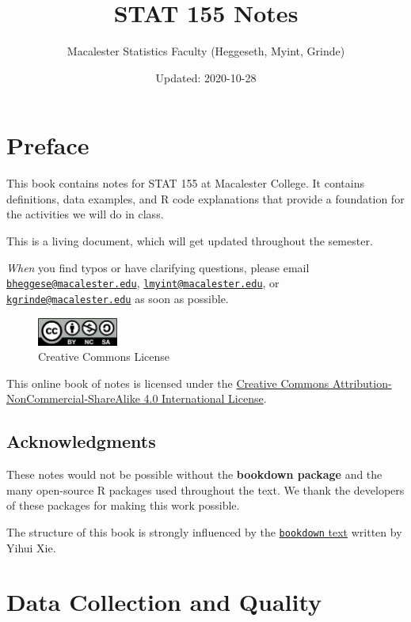 \documentclass[
]{book}
\title{STAT 155 Notes}
\author{Macalester Statistics Faculty (Heggeseth, Myint, Grinde)}
\date{Updated: 2020-10-28}
\begin{document}
\maketitle

{
\setcounter{tocdepth}{2}
\tableofcontents
}
\hypertarget{preface}{%
\chapter*{Preface}\label{preface}}


This book contains notes for STAT 155 at Macalester College. It contains definitions, data examples, and R code explanations that provide a foundation for the activities we will do in class.

This is a living document, which will get updated throughout the semester.

\emph{When} you find typos or have clarifying questions, please email \href{mailto:bheggese@macalester.edu}{\nolinkurl{bheggese@macalester.edu}}, \href{mailto:lmyint@macalester.edu}{\nolinkurl{lmyint@macalester.edu}}, or \href{mailto:kgrinde@macalester.edu}{\nolinkurl{kgrinde@macalester.edu}} as soon as possible.

\begin{figure}
\centering
\includegraphics[width=1.04167in,height=\textheight]{Photos/by-nc-sa.png}
\caption{Creative Commons License}
\end{figure}

This online book of notes is licensed under the \href{http://creativecommons.org/licenses/by-nc-sa/4.0/}{Creative Commons Attribution-NonCommercial-ShareAlike 4.0 International License}.

\hypertarget{acknowledgments}{%
\section*{Acknowledgments}\label{acknowledgments}}


These notes would not be possible without the \textbf{bookdown package} and the many open-source R packages used throughout the text. We thank the developers of these packages for making this work possible.

The structure of this book is strongly influenced by the \href{https://bookdown.org/yihui/bookdown}{\texttt{bookdown} text} written by Yihui Xie.

\hypertarget{data-collection-and-quality}{%
\chapter{Data Collection and Quality}\label{data-collection-and-quality}}
\end{document}
